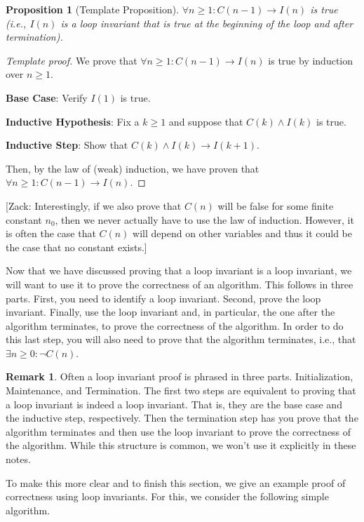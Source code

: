 \documentclass{article}
\theoremstyle{plain}
\newtheorem*{proposition*}{Proposition}
\theoremstyle{definition}
\newtheorem{remark}[theorem]{Remark}
\newcommand{\ra}{\rightarrow}
\newcommand{\DisplayNotes}{false} %
\newcommand{\zacktodo}[1]{%
    \ifthenelse{\equal{\DisplayNotes}{true}}%
        {{\color{magenta}[Zack: {#1}]}}%
        {}%
}
\begin{document}
\begin{proposition*}[Template Proposition]
    \(\forall n \geq 1 : C(n-1) \ra I(n)\) is true (i.e., \(I(n)\) is a loop invariant that is true at the beginning of the loop and after termination).
\end{proposition*}
\begin{proof}[Template proof]
    We prove that \(\forall n \geq 1 : C(n-1) \ra I(n)\) is true by induction over \(n \geq 1\).
    
    \textbf{Base Case}: Verify \(I(1)\) is true.

    \textbf{Inductive Hypothesis}: Fix a \(k \geq 1\) and suppose that \(C(k) \land I(k)\) is true.

    \textbf{Inductive Step}: Show that \(C(k) \land I(k) \ra I(k+1)\).

    Then, by the law of (weak) induction, we have proven that \(\forall n \geq 1 : C(n-1) \ra I(n)\).
\end{proof}
\zacktodo{Interestingly, if we also prove that \(C(n)\) will be false for some finite constant \(n_0\), then we never actually have to use the law of induction. However, it is often the case that \(C(n)\) will depend on other variables and thus it could be the case that no constant exists.}

Now that we have discussed proving that a loop invariant is a loop invariant, we will want to use it to prove the correctness of an algorithm. This follows in three parts. First, you need to identify a loop invariant. Second, prove the loop invariant. Finally, use the loop invariant and, in particular, the one after the algorithm terminates, to prove the correctness of the algorithm. In order to do this last step, you will also need to prove that the algorithm terminates, i.e., that \(\exists n \geq 0 : \lnot C(n)\).

\begin{remark}
    Often a loop invariant proof is phrased in three parts. Initialization, Maintenance, and Termination. The first two steps are equivalent to proving that a loop invariant is indeed a loop invariant. That is, they are the base case and the inductive step, respectively. Then the termination step has you prove that the algorithm terminates and then use the loop invariant to prove the correctness of the algorithm. While this structure is common, we won't use it explicitly in these notes.
\end{remark}

To make this more clear and to finish this section, we give an example proof of correctness using loop invariants. For this, we consider the following simple algorithm.
\end{document}
